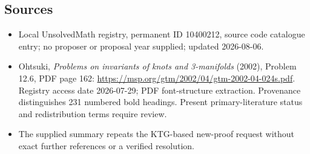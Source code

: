\documentclass[11pt]{article}
\begin{document}
\subsection{Sources}
\begin{itemize}
\item Local UnsolvedMath registry, permanent ID 10400212, source code catalogue entry; no proposer or proposal year supplied; updated 2026-08-06.
\item Ohtsuki, \emph{Problems on invariants of knots and 3-manifolds} (2002), Problem 12.6, PDF page 162: \url{https://msp.org/gtm/2002/04/gtm-2002-04-024s.pdf}. Registry access date 2026-07-29; PDF font-structure extraction. Provenance distinguishes 231 numbered bold headings. Present primary-literature status and redistribution terms require review.
\item The supplied summary repeats the KTG-based new-proof request without exact further references or a verified resolution.
\end{itemize}
\end{document}
